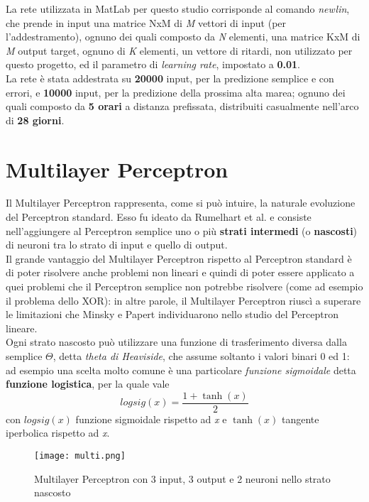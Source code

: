 		La rete utilizzata in MatLab per questo studio corrisponde al comando \textit{newlin}, che prende in input una matrice NxM di \textit{M} vettori di input (per l'addestramento), ognuno dei quali composto da \textit{N} elementi, una matrice KxM di \textit{M} output target, ognuno di \textit{K} elementi, un vettore di ritardi, non utilizzato per questo progetto, ed il parametro di \textit{learning rate}, impostato a \textbf{0.01}.\\
		La rete è stata addestrata su \textbf{20000} input, per la predizione semplice e con errori, e \textbf{10000} input, per la predizione della prossima alta marea; ognuno dei quali composto da \textbf{5 orari} a distanza prefissata, distribuiti casualmente nell'arco di \textbf{28 giorni}.
		
	\section{Multilayer Perceptron}
		Il Multilayer Perceptron rappresenta, come si può intuire, la naturale evoluzione del Perceptron standard. Esso fu ideato da Rumelhart et al. e consiste nell'aggiungere al Perceptron semplice uno o più \textbf{strati intermedi} (o \textbf{nascosti}) di neuroni tra lo strato di input e quello di output.\\
		Il grande vantaggio del Multilayer Perceptron rispetto al Perceptron standard è di poter risolvere anche problemi non lineari e quindi di poter essere applicato a quei problemi che il Perceptron semplice non potrebbe risolvere (come ad esempio il problema dello XOR): in altre parole, il Multilayer Perceptron riuscì a superare le limitazioni che Minsky e Papert individuarono nello studio del Perceptron lineare.\\
		Ogni strato nascosto può utilizzare una funzione di trasferimento diversa dalla semplice \(\Theta\), detta \textit{theta di Heaviside}, che assume soltanto i valori binari 0 ed 1: ad esempio una scelta molto comune è una particolare \textit{funzione sigmoidale} detta \textbf{funzione logistica}, per la quale vale
		\[logsig(x) = \frac{1+\tanh(x)}{2}\]
		con \(logsig(x)\) funzione sigmoidale rispetto ad \textit{x} e \(\tanh(x)\) tangente iperbolica rispetto ad \textit{x}.\\
		\begin{figure}[h]
			\centering
			\texttt{[image: multi.png]}
			\caption{Multilayer Perceptron con 3 input, 3 output e 2 neuroni nello strato nascosto}
		\end{figure}\\
